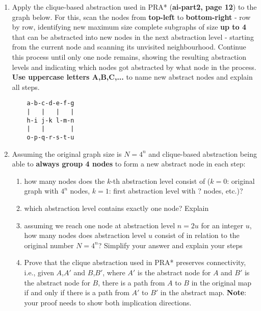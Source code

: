 \documentclass[a4paper,11pt]{article}
\begin{document}
\begin{enumerate}[label=(\alph*)]
\item 
    Apply the clique-based abstraction used in PRA* (\textbf{ai-part2, page 12}) to the
    graph below.
    For this, scan the nodes from \textbf{top-left} to \textbf{bottom-right} - row by
    row, identifying new maximum size complete subgraphs of size \textbf{up to 4} that can
    be abstracted into new nodes in the next abstraction level - starting from
    the current node and scanning its unvisited neighbourhood. Continue this
    process until only one node remains, showing the resulting abstraction levels
    and indicating which nodes got abstracted by what node in the process. 
    \textbf{Use uppercase letters A,B,C,...} 
    to name new abstract nodes and explain all steps.
{\Large
\begin{verbatim}
    a-b-c-d-e-f-g
    |   |   |   |
    h-i j-k l-m-n 
    |   |       |
    o-p-q-r-s-t-u
\end{verbatim}
}

\item 
    Assuming the original graph size is $N=4^n$ and clique-based
    abstraction being able to \textbf{always group 4 nodes} to form a new abstract node in
    each step:
    \begin{enumerate}[label=(\roman*)]
        \item how many nodes does the $k$-th abstraction level consist of ($k=0$: original
        graph with $4^n$ nodes, $k=1$: first abstraction level with ? nodes, etc.)?
        \item which abstraction level contains exactly one node? Explain
        \item assuming we reach one node at abstraction level $n=2u$ for an integer $u$,
        how many nodes does abstraction level $u$ consist of in relation to the
        original number $N=4^n$? Simplify your answer and explain your steps
        \item Prove that the clique abstraction used in PRA* preserves
        connectivity, i.e., given $A$,$A'$ and $B$,$B'$, where $A'$ is the abstract node for
        $A$ and $B'$ is the abstract node for $B$, there is a path from $A$ to $B$ in the
        original map if and only if there is a path from $A'$ to $B'$ in the abstract
        map. \textbf{Note}: your proof needs to show both implication directions.
    \end{enumerate}
\end{enumerate}
\end{document}
